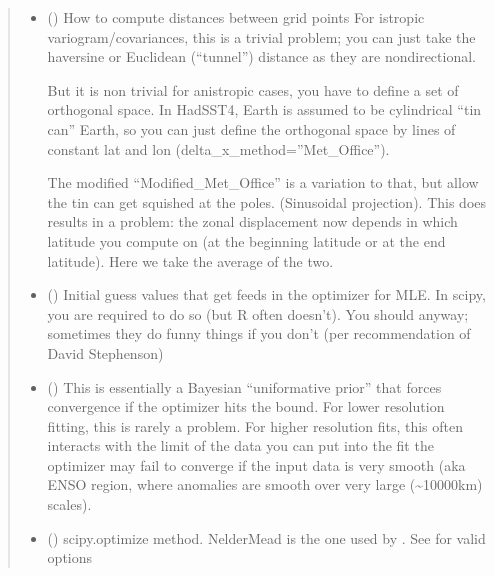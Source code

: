 \documentclass[letterpaper,10pt,english]{sphinxmanual}
\begin{document}
\begin{fulllineitems}
\begin{fulllineitems}
\begin{quote}
\begin{description}
\begin{itemize}
\item {}
\sphinxAtStartPar
{} () \textendash{}
\sphinxAtStartPar
How to compute distances between grid points
For istropic variogram/covariances, this is a trivial problem;
you can just take the haversine or
Euclidean (“tunnel”) distance as they are non\sphinxhyphen{}directional.

\sphinxAtStartPar
But it is non trivial for anistropic cases,
you have to define a set of orthogonal space. In HadSST4,
Earth is assumed to be cylindrical “tin can” Earth,
so you can just define the orthogonal space by
lines of constant lat and lon (delta\_x\_method=”Met\_Office”).

\sphinxAtStartPar
The modified “Modified\_Met\_Office” is a variation to that,
but allow the tin can get squished at the poles.
(Sinusoidal projection). This does results in a problem:
the zonal displacement now depends in which latitude
you compute on (at the beginning latitude or at the end latitude).
Here we take the average of the two.


\item {}
\sphinxAtStartPar
{} () \textendash{} Initial guess values that get feeds in the optimizer for MLE.
In scipy, you are required to do so (but R often doesn’t).
You should anyway; sometimes they do funny things
if you don’t (per recommendation of David Stephenson)

\item {}
\sphinxAtStartPar
{} () \textendash{} This is essentially a Bayesian “uniformative prior”
that forces convergence if the optimizer hits the bound.
For lower resolution fitting, this is rarely a problem.
For higher resolution fits, this often interacts with
the limit of the data you can put into the fit the optimizer
may fail to converge if the input data is very smooth (aka ENSO
region, where anomalies are smooth over very large (\textasciitilde{}10000km)
scales).

\item {}
\sphinxAtStartPar
{} () \textendash{} scipy.optimize method. Nelder\sphinxhyphen{}Mead is the one used by .
See 
for valid options


\end{itemize}
\end{description}
\end{quote}
\end{fulllineitems}
\end{fulllineitems}
\end{document}
